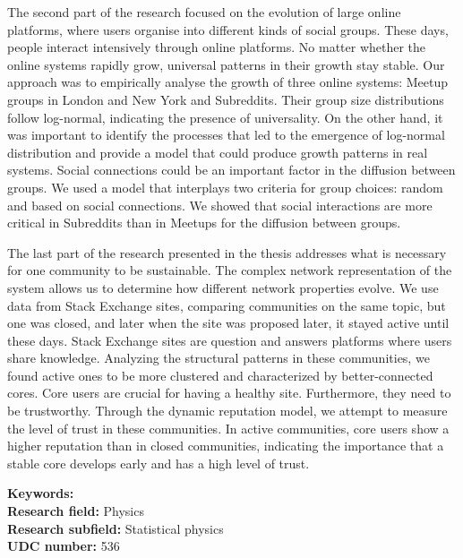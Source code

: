 The second part of the research focused on the evolution of large online platforms, where users organise into different kinds of social groups. These days, people interact intensively through online platforms. No matter whether the online systems rapidly grow, universal patterns in their growth stay stable. Our approach was to empirically analyse the growth of three online systems: Meetup groups in London and New York and Subreddits. Their group size distributions follow log-normal, indicating the presence of universality.
On the other hand, it was important to identify the processes that led to the emergence of log-normal distribution and provide a model that could produce growth patterns in real systems. Social connections could be an important factor in the diffusion between groups. We used a model that interplays two criteria for group choices: random and based on social connections. We showed that social interactions are more critical in Subreddits than in Meetups for the diffusion between groups. 

The last part of the research presented in the thesis addresses what is necessary for one community to be sustainable. The complex network representation of the system allows us to determine how different network properties evolve. We use data from Stack Exchange sites, comparing communities on the same topic, but one was closed, and later when the site was proposed later, it stayed active until these days. Stack Exchange sites are question and answers platforms where users share knowledge. Analyzing the structural patterns in these communities, we found active ones to be more clustered and characterized by better-connected cores. Core users are crucial for having a healthy site.
Furthermore, they need to be trustworthy. Through the dynamic reputation model, we attempt to measure the level of trust in these communities. In active communities, core users show a higher reputation than in closed communities, indicating the importance that a stable core develops early and has a high level of trust. 



\noindent
{\textbf {Keywords:}} \\ %
{\textbf {Research field:}} Physics \\
{\textbf {Research subfield:}} Statistical physics\\
\textbf{UDC number:} 536 %

\hfill

\justify

